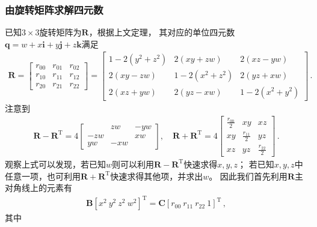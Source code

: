 \subsubsection{由旋转矩阵求解四元数}
已知$3\times3$旋转矩阵为$\bm R$，根据上文定理，
其对应的单位四元数$\bm q=w+x\mathbf{i}+y\mathbf{j}+z\mathbf{k}$满足
\begin{align}
    \bm R=\left[\begin{array}{ccc}
            r_{00} & r_{01} & r_{02} \\
            r_{10} & r_{11} & r_{12} \\
            r_{20} & r_{21} & r_{22}
        \end{array}\right]
    =\left[\begin{array}{ccc}
            1-2(y^2+z^2) & 2(xy+zw)     & 2(xz-yw)     \\
            2(xy-zw)     & 1-2(x^2+z^2) & 2(yz+xw)     \\
            2(xz+yw)     & 2(yz-xw)     & 1-2(x^2+y^2)
        \end{array}\right]\, .
\end{align}
注意到
\begin{align}\label{eq:02ex.1}
    \bm R-\bm R^\mathrm{T}=4\left[\begin{array}{ccc}
                & zw  & -yw \\
            -zw &     & xw  \\
            yw  & -xw &
        \end{array}\right],\quad
    \bm R+\bm R^\mathrm{T}=4\left[\begin{array}{ccc}
            \displaystyle\frac{r_{00}}{2} & xy                            & xz                            \\
            xy                            & \displaystyle\frac{r_{11}}{2} & yz                            \\
            xz                            & yz                            & \displaystyle\frac{r_{22}}{2}
        \end{array}\right]\, .
\end{align}
观察上式可以发现，若已知$w$则可以利用$\bm R-\bm R^\mathrm{T}$快速求得$x,y,z$；
若已知$x,y,z$中任意一项，也可利用$\bm R+\bm R^\mathrm{T}$快速求得其他项，并求出$w$。
因此我们首先利用$\bm R$主对角线上的元素有
\begin{align}
    \bm B[x^2\ y^2\ z^2\ w^2]^\mathrm{T}=\bm C[r_{00}\ r_{11}\ r_{22}\ 1]^\mathrm{T}\, ,
\end{align}
其中
